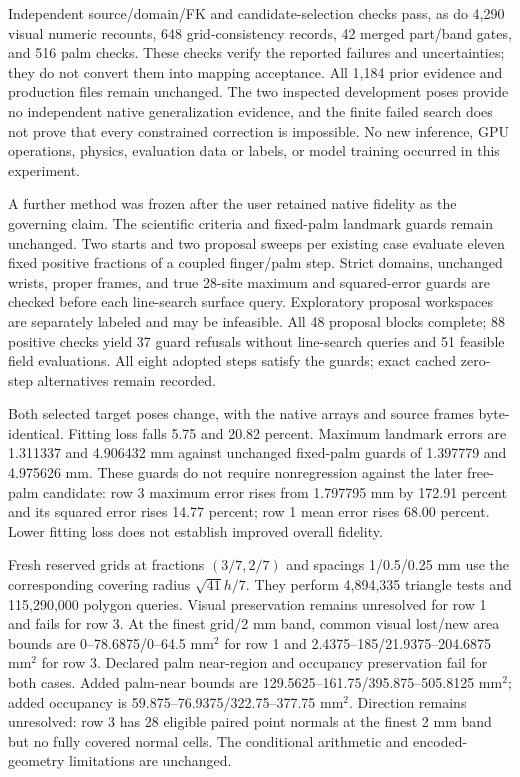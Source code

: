 \documentclass[10pt,letterpaper]{article}
\begin{document}
Independent source/domain/FK and candidate-selection checks pass, as do
4,290 visual numeric recounts, 648 grid-consistency records, 42 merged part/band
gates, and 516 palm checks. These checks verify the reported failures and
uncertainties; they do not convert them into mapping acceptance. All 1,184 prior
evidence and production files remain unchanged. The two inspected development
poses provide no independent native generalization evidence, and the finite
failed search does not prove that every constrained correction is impossible.
No new inference, GPU operations, physics, evaluation data or labels, or model
training occurred in this experiment.

A further method was frozen after the user retained native fidelity as the
governing claim. The scientific criteria and fixed-palm landmark guards remain
unchanged. Two starts and two proposal sweeps per existing case evaluate eleven
fixed positive fractions of a coupled finger/palm step. Strict domains,
unchanged wrists, proper frames, and true 28-site maximum and squared-error
guards are checked before each line-search surface query. Exploratory proposal
workspaces are separately labeled and may be infeasible. All 48 proposal blocks
complete; 88 positive checks yield 37 guard refusals without line-search queries
and 51 feasible field evaluations. All eight adopted steps satisfy the guards;
exact cached zero-step alternatives remain recorded.

Both selected target poses change, with the native arrays and source frames
byte-identical. Fitting loss falls 5.75 and 20.82 percent. Maximum landmark
errors are 1.311337 and 4.906432 mm against unchanged fixed-palm guards of
1.397779 and 4.975626 mm. These guards do not require nonregression against
the later free-palm candidate: row 3 maximum error rises from 1.797795 mm
by 172.91 percent and its squared error rises 14.77 percent; row 1 mean
error rises 68.00 percent. Lower fitting loss does not establish improved
overall fidelity.

Fresh reserved grids at fractions $(3/7,2/7)$ and spacings 1/0.5/0.25 mm
use the corresponding covering radius $\sqrt{41}h/7$. They perform
4,894,335 triangle tests and 115,290,000 polygon queries. Visual preservation
remains unresolved for row 1 and fails for row 3. At the finest grid/2 mm
band, common visual lost/new area bounds are 0--78.6875/0--64.5 mm$^2$
for row 1 and 2.4375--185/21.9375--204.6875 mm$^2$ for row 3. Declared
palm near-region and occupancy preservation fail for both cases. Added
palm-near bounds are 129.5625--161.75/395.875--505.8125 mm$^2$; added
occupancy is 59.875--76.9375/322.75--377.75 mm$^2$. Direction remains
unresolved: row 3 has 28 eligible paired point normals at the finest 2 mm
band but no fully covered normal cells. The conditional arithmetic and
encoded-geometry limitations are unchanged.
\end{document}
